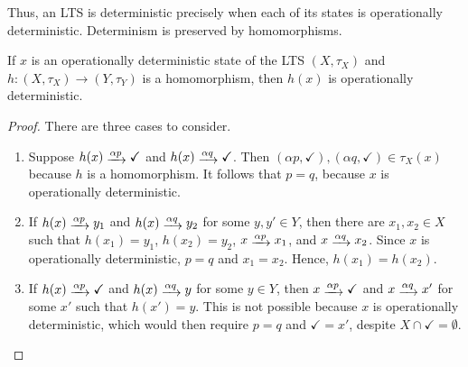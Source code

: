 \documentclass[orivec,envcountsect,envcountsame]{llncs}
\begin{document}
Thus, an LTS is deterministic precisely when each of its states is operationally deterministic.
Determinism is preserved by homomorphisms.

\begin{lemma}\label{lem:determinism homom}
	If \(x\) is an operationally deterministic state of the LTS \((X,\tau_X)\) and \(h \colon (X,\tau_X) \to (Y,\tau_Y)\) is a homomorphism, then \(h(x)\) is operationally deterministic.
\end{lemma}

\begin{proof}
	There are three cases to consider.
	\begin{enumerate}
		\item Suppose \(h(x) \tr{\alpha p} \checkmark\) and \(h(x) \tr{\alpha q} \checkmark\).
		Then \((\alpha p, \checkmark),(\alpha q,\checkmark) \in \tau_X(x)\) because \(h\) is a homomorphism.
		It follows that \(p = q\), because \(x\) is operationally deterministic.
		\item If \(h(x) \tr{\alpha p} y_1\) and \(h(x) \tr{\alpha q} y_2\) for some \(y,y' \in Y\), then there are \(x_1,x_2 \in X\) such that \(h(x_1) = y_1\), \(h(x_2) = y_2\), \(x \tr{\alpha p} x_1\), and \(x \tr{\alpha q} x_2\).
		Since \(x\) is operationally deterministic, \(p = q\) and \(x_1 = x_2\).
		Hence, \(h(x_1) = h(x_2)\).
		\item If \(h(x) \tr{\alpha p} \checkmark\) and \(h(x) \tr{\alpha q} y\) for some \(y \in Y\), then \(x \tr{\alpha p} \checkmark\) and \(x \tr{\alpha q} x'\) for some \(x'\) such that \(h(x') = y\).
		This is not possible because \(x\) is operationally deterministic, which would then require \(p = q\) and \(\checkmark = x'\), despite \(X \cap \checkmark = \emptyset\).
	\end{enumerate}
\end{proof}
\end{document}
